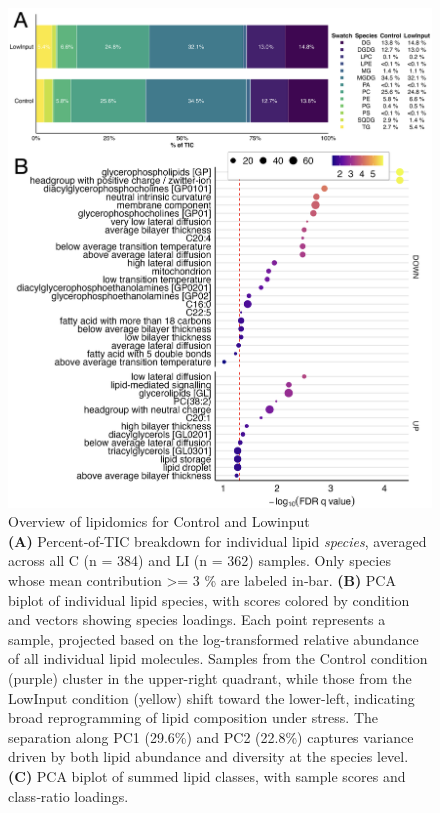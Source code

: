 \documentclass[10pt,letterpaper]{article}
\begin{document}
\begin{figure}[htbp]
  \centering
  \includegraphics[width=\textwidth]{fig/main/Fig1.png}

    \caption{Overview of lipidomics for Control and Lowinput \\
    \textbf{(A)} Percent‐of‐TIC breakdown for individual lipid \emph{species}, averaged across all C (n = 384) and LI (n = 362) samples. Only species whose mean contribution >= 3 \% are labeled in‐bar.  
    \textbf{(B)} PCA biplot of individual lipid species, with scores colored by condition and vectors showing species loadings. Each point represents a sample, projected based on the log-transformed relative abundance of all individual lipid molecules. Samples from the Control condition (purple) cluster in the upper-right quadrant, while those from the LowInput condition (yellow) shift toward the lower-left, indicating broad reprogramming of lipid composition under stress. The separation along PC1 (29.6\%) and PC2 (22.8\%) captures variance driven by both lipid abundance and diversity at the species level.
    \textbf{(C)} PCA biplot of summed lipid classes, with sample scores and class‐ratio loadings.}
    
  \label{fig:Fig1_lipid_class}
\end{figure}
\end{document}
